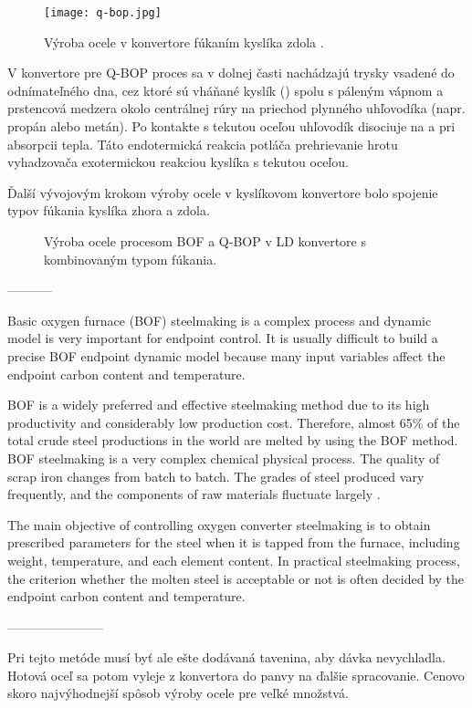 \begin{figure}
\centering
\texttt{[image: q-bop.jpg]}
\caption{Výroba ocele v konvertore fúkaním kyslíka zdola \citep{Turkdogan1996}.}
\label{o:3}
\end{figure}

V konvertore pre Q-BOP proces sa v dolnej časti nachádzajú trysky vsadené do odnímateľného dna, cez ktoré sú vháňané kyslík () spolu s páleným vápnom a prstencová medzera okolo centrálnej rúry na priechod plynného uhľovodíka (napr. propán alebo metán). Po kontakte s tekutou oceľou uhľovodík disociuje na  a  pri absorpcii tepla. Táto endotermická reakcia potláča prehrievanie hrotu vyhadzovača exotermickou reakciou kyslíka s tekutou oceľou.

Ďalší vývojovým krokom výroby ocele v kyslíkovom konvertore bolo spojenie typov fúkania kyslíka zhora a zdola.


\begin{figure}[!tbp]
	\centering
	\hfill
	\caption{Výroba ocele procesom BOF a Q-BOP v LD konvertore s kombinovaným typom fúkania.}
	\label{o:4}
\end{figure}


-----------

Basic oxygen furnace (BOF) steelmaking is a complex process and dynamic model is very important for endpoint control. It is usually difficult to build a precise BOF endpoint dynamic model because many input variables affect the endpoint carbon content and temperature.


BOF is a widely preferred and effective steelmaking method
due to its high productivity and considerably low production cost. Therefore, almost 65\% of the total crude steel productions in the world are melted by using the BOF method. BOF steelmaking is a very complex chemical physical process. The quality of scrap iron changes from batch to batch. The grades of steel produced vary frequently, and the components of raw materials fluctuate largely \cite{Wang2010}.

The main objective of controlling oxygen converter steelmaking is to obtain prescribed parameters for the steel when it is tapped from the furnace, including weight, temperature, and each element content. In practical steelmaking process, the criterion whether the molten steel is acceptable or not is often decided by the endpoint carbon content and temperature.

-----------------------

Pri tejto metóde musí byť ale ešte dodávaná tavenina, aby dávka nevychladla.
Hotová oceľ sa potom vyleje z konvertora do panvy na ďalšie spracovanie.
Cenovo skoro najvýhodnejší spôsob výroby ocele pre veľké množstvá.
